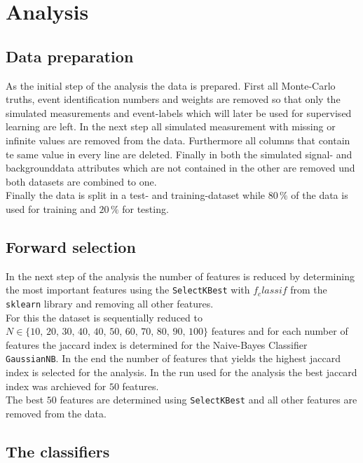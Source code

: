 \section{Analysis}\label{sec:Analysis}

\subsection{Data preparation}

As the initial step of the analysis the data is prepared.
First all Monte-Carlo truths, event identification numbers and weights are removed so that only the simulated measurements and
event-labels which will later be used for supervised learning are left. In the next step all simulated measurement with missing or
infinite values are removed from the data. Furthermore all columns that contain te same value in every line are deleted.
Finally in both the simulated signal- and backgrounddata attributes which are not contained in the other are removed und
both datasets are combined to one. \\
Finally the data is split in a test- and training-dataset while $80 \, \%$ of the data is used for training and $20 \,\%$
for testing.

\subsection{Forward selection}

In the next step of the analysis the number of features is reduced by determining the most important features using
the \texttt{SelectKBest} with \texttt{$f_classif$} from the \texttt{sklearn} library and removing all other features. \\
For this the dataset is sequentially reduced to $N \in \{ 10, \, 20, \, 30, \, 40, \, 40, \, 50, \, 60, \, 70, \, 80, \, 90, \, 100 \}$
features and for each number of features the jaccard index is determined for the Naive-Bayes Classifier \texttt{GaussianNB}.
In the end the number of features that yields the highest jaccard index is selected for the analysis.
In the run used for the analysis the best jaccard index was archieved for $50$ features. \\
The best $50$ features are determined using \texttt{SelectKBest} and all other features are removed from the data.

\subsection{The classifiers}

